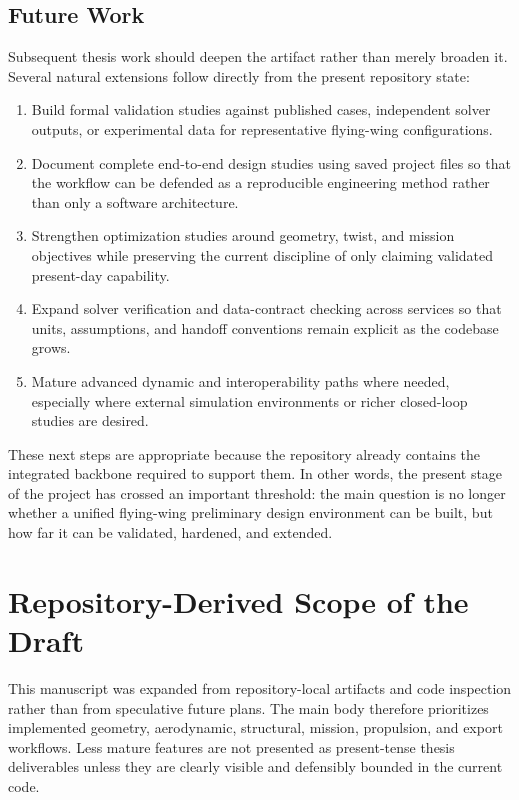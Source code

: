 \documentclass[12pt]{report}
\begin{document}
\section{Future Work}
Subsequent thesis work should deepen the artifact rather than merely broaden it. Several natural extensions follow directly from the present repository state:
\begin{enumerate}[label=\arabic*.]
\item Build formal validation studies against published cases, independent solver outputs, or experimental data for representative flying-wing configurations.
\item Document complete end-to-end design studies using saved project files so that the workflow can be defended as a reproducible engineering method rather than only a software architecture.
\item Strengthen optimization studies around geometry, twist, and mission objectives while preserving the current discipline of only claiming validated present-day capability.
\item Expand solver verification and data-contract checking across services so that units, assumptions, and handoff conventions remain explicit as the codebase grows.
\item Mature advanced dynamic and interoperability paths where needed, especially where external simulation environments or richer closed-loop studies are desired.
\end{enumerate}

These next steps are appropriate because the repository already contains the integrated backbone required to support them. In other words, the present stage of the project has crossed an important threshold: the main question is no longer whether a unified flying-wing preliminary design environment can be built, but how far it can be validated, hardened, and extended.

\clearpage


\appendix
\chapter{Repository-Derived Scope of the Draft}
This manuscript was expanded from repository-local artifacts and code inspection rather than from speculative future plans. The main body therefore prioritizes implemented geometry, aerodynamic, structural, mission, propulsion, and export workflows. Less mature features are not presented as present-tense thesis deliverables unless they are clearly visible and defensibly bounded in the current code.
\end{document}
